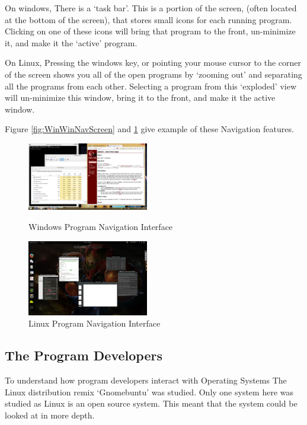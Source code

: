 \documentclass[a4paper]{report}
\begin{document}
On windows, There is a `task bar'. This is a portion of the screen, (often located at the bottom of the screen), that stores small icons for each running program. Clicking on one of these icons will bring that program to the front, un-minimize it, and make it the `active' program.

On Linux, Pressing the windows key, or pointing your mouse cursor to the corner of the screen shows you all of the open programs by `zooming out' and separating all the programs from each other. Selecting a program from this `exploded' view will un-minimize this window, bring it to the front, and make it the active window. 

Figure \ref{fig:WinWinNavScreen} and \ref{fig:LinWinNavScreen} give example of these Navigation features.

\begin{figure}[ht]
\centering
\begin{minipage}{.5\textwidth}
  \centering
  \includegraphics[width=200px]{images/Windows_Window_Navigation_Screenshot}
  \caption{Windows Program Navigation Interface}
  \label{fig:WinWinNavScreen}
\end{minipage}%
\begin{minipage}{.5\textwidth}
  \centering
  \includegraphics[width=200px]{images/Linux_Window_Navigation_Screenshot}
  \caption{Linux Program Navigation Interface}
  \label{fig:LinWinNavScreen}
\end{minipage} 
\end{figure}


\clearpage
\subsection*{The Program Developers}

To understand how program developers interact with Operating Systems The Linux distribution remix `Gnomebuntu' was studied. Only one system here was studied as Linux is an open source system. This meant that the system could be looked at in more depth.
\end{document}
